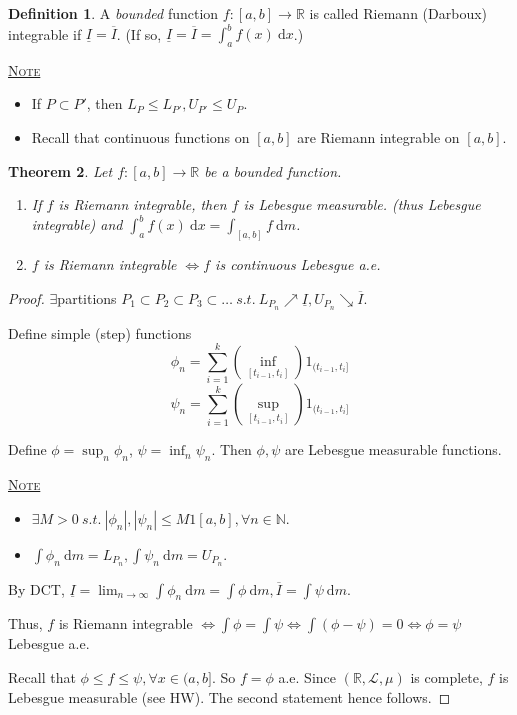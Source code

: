 \documentclass{report}
\newcommand{\R}{\mathbb{R}}
\newcommand{\N}{\mathbb{N}}
\newcommand{\st}{\ s.t.\ }
\newcommand{\df}{\ \mathrm{d}}
\newcommand{\fancyem}[1]{\underline{\textsc{#1}}}
\newtheorem{theorem}{Theorem}[chapter]
\theoremstyle{definition}
\newtheorem{definition}[theorem]{Definition}
\theoremstyle{remark}
\begin{document}
\begin{definition}
	A \emph{bounded} function $f:[a, b] \to \R$ is called Riemann (Darboux) integrable if $\underline{I} = \overline{I}$. (If so, $\underline{I} = \overline{I} = \int_a^b f(x)\df x$.)
\end{definition}
\fancyem{Note} \begin{itemize}
	\item If $P \subset P'$, then $L_P \leq L_{P'}, U_{P'} \leq U_P$.
	\item Recall that continuous functions on $[a, b]$ are Riemann integrable on $[a, b]$.
\end{itemize}

\begin{theorem}
	Let $f: [a, b] \to \R$ be a bounded function.
	\begin{enumerate}
		\item If $f$ is Riemann integrable, then $f$ is Lebesgue measurable. (thus Lebesgue integrable) and $\displaystyle \int_a^b f(x) \df x = \int_{[a, b]}f \df m$.
		\item $f$ is Riemann integrable $\iff f$ is continuous Lebesgue a.e.
	\end{enumerate}
\end{theorem}
\begin{proof}
	$\exists$partitions $P_1 \subset P_2 \subset P_3 \subset \ldots \st L_{P_n} \nearrow \underline{I}, U_{P_n} \searrow \overline{I}$.

	Define simple (step) functions 
	\[\phi_n = \sum_{i=1}^k\left(\inf_{[t_{i - 1}, t_i]}\right)1_{(t_{i-1}, t_i]}\]
	\[\psi_n = \sum_{i=1}^k\left(\sup_{[t_{i - 1}, t_i]}\right)1_{(t_{i-1}, t_i]}\]

	Define $\phi = \sup_n \phi_n$, $\psi = \inf_n \psi_n$. Then $\phi, \psi$ are Lebesgue measurable functions.

	\fancyem{Note} \begin{itemize}
		\item $\exists M > 0 \st |\phi_n|, |\psi_n| \leq M1[a, b], \forall n \in \N$.
		\item $\int \phi_n \df m = L_{P_n}, \int \psi_n \df m = U_{P_n}$.
	\end{itemize}
	By DCT, $\displaystyle \underline{I} = \lim_{n \to \infty} \int \phi_n \df m = \int \phi \df m,  \overline{I} = \int \psi \df m$.

	Thus, $f$ is Riemann integrable $\iff \int \phi = \int \psi \iff \int (\phi - \psi) = 0 \iff \phi = \psi$ Lebesgue a.e.

	Recall that $\phi \leq f \leq \psi, \forall x \in (a, b]$. So $f = \phi$ a.e. Since $(\R, \mathcal{L}, \mu)$ is complete, $f$ is Lebesgue measurable (see HW). The second statement hence follows.
\end{proof}
\end{document}
